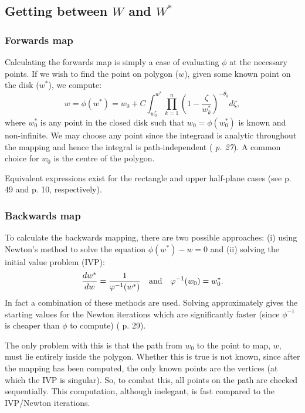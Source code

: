 \subsection{Getting between $W$ and $W^*$}

\subsubsection{Forwards map}

Calculating the forwards map is simply a case of evaluating $\phi$ at the necessary points. If we wish to find the point on polygon ($w$), given some known point on the disk ($w^*$), we compute:
\begin{equation}
\label{forwardsmap}
w=\phi(w^*) = w_0 + C \int_{w^*_0}^{w^*} \prod_{k=1}^{n} (1 - \frac{\zeta}{w^*_k})^{-\theta_k} d\zeta,
\end{equation}
where $w^*_0$ is any point in the closed disk such that $w_0 = \phi(w^*_0)$ is known and non-infinite. We may choose any point since the integrand is analytic throughout the mapping and hence the integral is path-independent (\cite{driscoll} \emph{p. 27}). A common choice for $w_0$ is the centre of the polygon.

Equivalent expressions exist for the rectangle and upper half-plane cases (see \cite{driscoll} p. 49 and p. 10, respectively).

\subsubsection{Backwards map}

To calculate the backwards mapping, there are two possible approaches: (i) using Newton's method to solve the equation $\phi(w^*)-w=0$ and (ii) solving the initial value problem (IVP):
\begin{equation}
\label{scivp}
\frac{dw^*}{dw}=\frac{1}{\varphi^{-1}(w^*)} \quad \text{and} \quad \varphi^{-1}(w_0)=w^*_0.
\end{equation}
In fact a combination of these methods are used. Solving  approximately gives the starting values for the Newton iterations which are significantly faster (since $\phi^{-1}$ is cheaper than $\phi$ to compute) (\cite{driscoll} p. 29).

The only problem with this is that the path from $w_0$ to the point to map, $w$, must lie entirely inside the polygon. Whether this is true is not known, since after the mapping has been computed, the only known points are the vertices (at which the IVP is singular). So, to combat this, all points on the path are checked sequentially. This computation, although inelegant, is fast compared to the IVP/Newton iterations.

